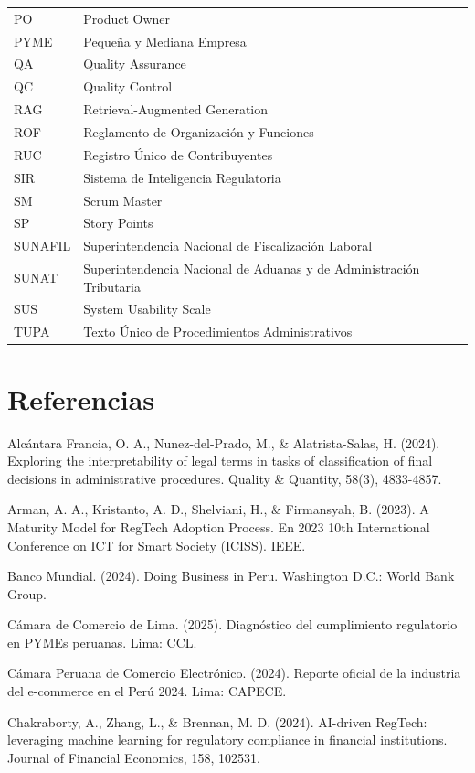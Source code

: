 \documentclass[12pt,a4paper,oneside]{report}
\begin{document}
\begin{longtable}[]{@{}
  >{\raggedright\arraybackslash}p{}
  >{\raggedright\arraybackslash}p{}@{}}
PO & Product Owner \\
PYME & Pequeña y Mediana Empresa \\
QA & Quality Assurance \\
QC & Quality Control \\
RAG & Retrieval-Augmented Generation \\
ROF & Reglamento de Organización y Funciones \\
RUC & Registro Único de Contribuyentes \\
SIR & Sistema de Inteligencia Regulatoria \\
SM & Scrum Master \\
SP & Story Points \\
SUNAFIL & Superintendencia Nacional de Fiscalización Laboral \\
SUNAT & Superintendencia Nacional de Aduanas y de Administración
Tributaria \\
SUS & System Usability Scale \\
TUPA & Texto Único de Procedimientos Administrativos \\
\end{longtable}

\section{Referencias}\label{referencias}

Alcántara Francia, O. A., Nunez-del-Prado, M., \& Alatrista-Salas, H.
(2024). Exploring the interpretability of legal terms in tasks of
classification of final decisions in administrative procedures. Quality
\& Quantity, 58(3), 4833-4857.

Arman, A. A., Kristanto, A. D., Shelviani, H., \& Firmansyah, B. (2023).
A Maturity Model for RegTech Adoption Process. En 2023 10th
International Conference on ICT for Smart Society (ICISS). IEEE.

Banco Mundial. (2024). Doing Business in Peru. Washington D.C.: World
Bank Group.

Cámara de Comercio de Lima. (2025). Diagnóstico del cumplimiento
regulatorio en PYMEs peruanas. Lima: CCL.

Cámara Peruana de Comercio Electrónico. (2024). Reporte oficial de la
industria del e-commerce en el Perú 2024. Lima: CAPECE.

Chakraborty, A., Zhang, L., \& Brennan, M. D. (2024). AI-driven RegTech:
leveraging machine learning for regulatory compliance in financial
institutions. Journal of Financial Economics, 158, 102531.
\end{document}
